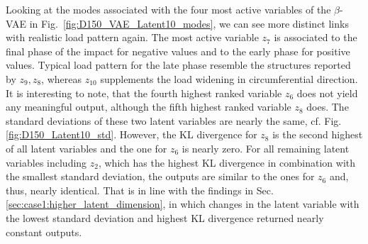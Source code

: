 Looking at the modes associated with the four most active variables of the $\beta$-VAE  in Fig.~\ref{fig:D150_VAE_Latent10_modes}, we can see more distinct links with realistic load pattern again. The most active variable $z_7$ is associated to the final phase of the impact for negative values and to the early phase for positive values. Typical load pattern for the late phase resemble the structures reported by $z_9, z_8$, whereas $z_{10}$ supplements the load widening in circumferential direction.  
%
It is interesting to note, that the fourth highest ranked variable $z_6$ does not yield any meaningful output, although the fifth highest ranked variable $z_8$ does. The standard deviations of these two latent variables are nearly the same, cf. Fig. \ref{fig:D150_Latent10_std}. However, the KL divergence for $z_8$ is the second highest of all latent variables and the one for $z_6$ is nearly zero. For all remaining latent variables including $z_2$, which has the highest KL divergence in combination with the smallest standard deviation, the outputs are similar to the ones for $z_6$ and, thus, nearly identical. That is in line with the findings in Sec. \ref{sec:case1:higher_latent_dimension}, in which changes in the latent variable with the lowest standard deviation and highest KL divergence returned nearly constant outputs.  


